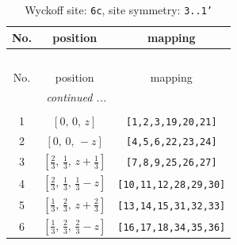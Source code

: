 \documentclass[fleqn,8pt]{jsarticle}
\begin{document}
\renewcommand{\arraystretch}{1.2}
\begin{longtable}{ccc}
\caption{Wyckoff site: {\tt 6c}, site symmetry: {\tt 3..1'}}
 \\
 \hline \hline
No. & position & mapping \\ \hline \endfirsthead

\multicolumn{2}{l}{\tablename\ \thetable{}} \\
 \hline \hline
No. & position & mapping \\ \hline \endhead

 \hline \hline
\multicolumn{2}{r}{\footnotesize\it continued ...} \\ \endfoot

 \hline \hline
\multicolumn{2}{r}{} \\ \endlastfoot

1 & $\left[ 0,\, 0,\, z \right]$ & {\tt [1,2,3,19,20,21]} \\ \hline
2 & $\left[ 0,\, 0,\, - z \right]$ & {\tt [4,5,6,22,23,24]} \\ \hline
3 & $\left[ \frac{2}{3},\, \frac{1}{3},\, z + \frac{1}{3} \right]$ & {\tt [7,8,9,25,26,27]} \\ \hline
4 & $\left[ \frac{2}{3},\, \frac{1}{3},\, \frac{1}{3} - z \right]$ & {\tt [10,11,12,28,29,30]} \\ \hline
5 & $\left[ \frac{1}{3},\, \frac{2}{3},\, z + \frac{2}{3} \right]$ & {\tt [13,14,15,31,32,33]} \\ \hline
6 & $\left[ \frac{1}{3},\, \frac{2}{3},\, \frac{2}{3} - z \right]$ & {\tt [16,17,18,34,35,36]} \\
\end{longtable}
\renewcommand{\arraystretch}{1.2}
\end{document}
